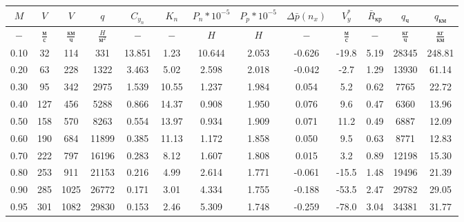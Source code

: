 \begin{tabular}{|c|c|c|c|c|c|c|c|c|c|c|c|c|}
\hline
$M$ & $V$ & $V$ & $q$ & $C_{y_n}$ & $K_n$ & $P_n*10^{-5}$ & $P_p*10^{-5}$ & $\Delta \bar{p}(n_x)$ & $V_y^*$ & $\bar{R}_{кр}$ & $q_{ч}$ & $q_{км}$ \\ 
\hline
$-$ & $\frac{м}{с}$ & $\frac{км}{ч}$ & $\frac{H}{м^2}$ & $-$ & $-$ & $H$ & $H$ & $-$ & $\frac{м}{с}$ & $-$ & $\frac{кг}{ч}$ & $\frac{кг}{км}$ \\ 
\hline
0.10 & 32 & 114 & 331 & 13.851 & 1.23 & 10.644 & 2.053 & -0.626 & -19.8 & 5.19 & 28345 & 248.81 \\ 
\hline
0.20 & 63 & 228 & 1322 & 3.463 & 5.02 & 2.598 & 2.018 & -0.042 & -2.7 & 1.29 & 13930 & 61.14 \\ 
\hline
0.30 & 95 & 342 & 2975 & 1.539 & 10.55 & 1.237 & 1.984 & 0.054 & 5.2 & 0.62 & 7765 & 22.72 \\ 
\hline
0.40 & 127 & 456 & 5288 & 0.866 & 14.37 & 0.908 & 1.950 & 0.076 & 9.6 & 0.47 & 6360 & 13.96 \\ 
\hline
0.50 & 158 & 570 & 8263 & 0.554 & 13.97 & 0.934 & 1.909 & 0.071 & 11.2 & 0.49 & 6887 & 12.09 \\ 
\hline
0.60 & 190 & 684 & 11899 & 0.385 & 11.13 & 1.172 & 1.858 & 0.050 & 9.5 & 0.63 & 8771 & 12.83 \\ 
\hline
0.70 & 222 & 797 & 16196 & 0.283 & 8.12 & 1.607 & 1.808 & 0.015 & 3.2 & 0.89 & 12198 & 15.30 \\ 
\hline
0.80 & 253 & 911 & 21153 & 0.216 & 4.99 & 2.614 & 1.771 & -0.061 & -15.5 & 1.48 & 19496 & 21.39 \\ 
\hline
0.90 & 285 & 1025 & 26772 & 0.171 & 3.01 & 4.334 & 1.755 & -0.188 & -53.5 & 2.47 & 29782 & 29.05 \\ 
\hline
0.95 & 301 & 1082 & 29830 & 0.153 & 2.46 & 5.309 & 1.748 & -0.259 & -78.0 & 3.04 & 34381 & 31.77 \\ 
\hline
\end{tabular}